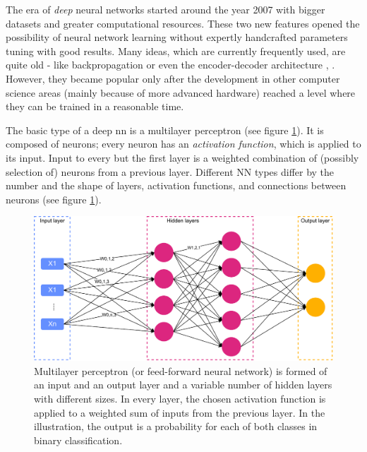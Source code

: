 The era of \textit{deep} neural networks started around the year 2007 \citep{Goodfellow-et-al-2016} with bigger datasets and greater computational resources. These two new features opened the possibility of neural network learning without expertly handcrafted parameters tuning with good results.
Many ideas, which are currently frequently used, are quite old - like backpropagation \citep{Rumelhart} or even the encoder-decoder architecture \citep{Allen19}, \citep{Forcada1997}. However, they became popular only after the development in other computer science areas (mainly because of more advanced hardware) reached a level where they can be trained in a reasonable time.
\par
The basic type of a deep \acrfull{nn} is a multilayer perceptron (see figure \ref{pic:multilayer}).
It is composed of neurons; every neuron has an \textit{activation function}, which is applied to its input. Input to every but the first layer is a weighted combination of (possibly selection of) neurons from a previous layer. 
Different NN types differ by the number and the shape of layers, activation functions, and connections between neurons (see figure \ref{pic:multilayer}).
\begin{figure}[H]
\centering
\includegraphics[width=1\columnwidth]{../img/multilayer}
\caption[A Multilayer perceptron architecture]{Multilayer perceptron (or feed-forward neural network) is formed of an input and an output layer and a variable number of hidden layers with different sizes. In every layer, the chosen activation function is applied to a weighted sum of inputs from the previous layer. In the illustration, the output is a probability for each of both classes in binary classification.}
\label{pic:multilayer}
\end{figure}
\par
